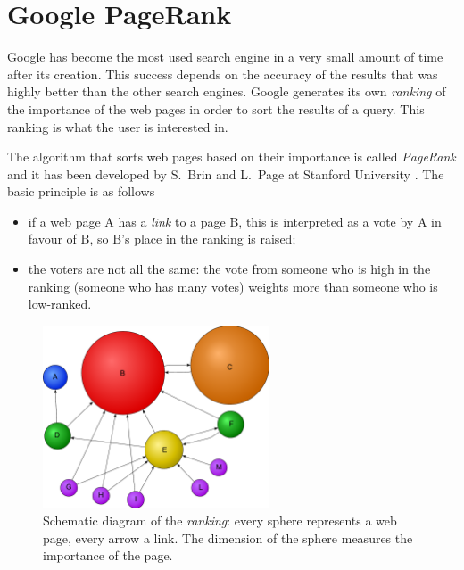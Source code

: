 \section*{Google PageRank}

Google has become the most used search engine in a very small amount of time
after its creation. This success depends on the accuracy of the results that
was highly better than the other search engines. Google generates its own
\emph{ranking} of the importance of the web pages in order to sort the results
of a query. This ranking is what the user is interested in.

The algorithm that sorts web pages based on their importance is called
\emph{PageRank} and it has been developed by S.~Brin and L.~Page at Stanford
University \cite{Brin1998}. The basic principle is as follows
\begin{itemize}

    \item if a web page A has a \emph{link} to a page B, this is interpreted as
    a vote by A in favour of B, so B's place in the ranking is raised;

    \item the voters are not all the same: the vote from someone who is high in
    the ranking (someone who has many votes) weights more than someone who is
    low-ranked.

\end{itemize}

\begin{figure}
    \centering
    \includegraphics[width=0.6\textwidth]{./fig/PageRanks_Example_only_letters}
    \caption{Schematic diagram of the \emph{ranking}: every sphere represents
    a web page, every arrow a link. The dimension of the sphere measures the
    importance of the page.}
    \label{fig:PR}
\end{figure}

